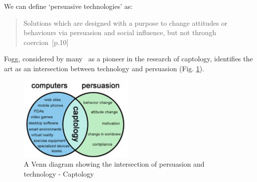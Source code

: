 We can define `persuasive technologies' as:
\begin{quotation}
\noindent
Solutions which are designed with a purpose to change attitudes or behaviours via persuasion and social influence, but not through coercion~\cite{fogg}[p.10]
\end{quotation}

Fogg, considered by many~\cite{fogg1}\cite{fogg2} as a pioneer in the research of captology, identifies the art as an intersection between technology and persuasion (Fig. \ref{fig:captologyVenn}). 

\begin{figure}[H]
  \centering
    \includegraphics[width=0.5\textwidth]{img/captology-figure-3.png}
      \caption{A Venn diagram showing the intersection of persuasion and technology - Captology}
      \label{fig:captologyVenn}
\end{figure}

